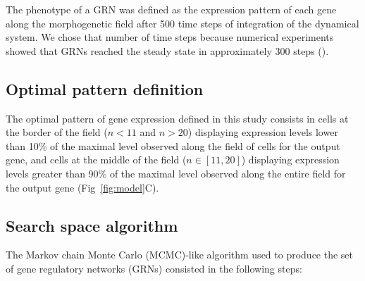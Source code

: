 \documentclass[10pt,letterpaper]{article}
\begin{document}
The phenotype of a GRN was defined as the expression pattern of each gene along
the morphogenetic field after 500 time steps of integration of the dynamical
system. We chose that number of time steps because numerical experiments showed
that GRNs reached the steady state in approximately 300 steps ().

\subsection*{Optimal pattern definition}

The optimal pattern of gene expression defined in this study consists in cells at
the border of the field ($n<11$ and $n>20$) displaying expression levels lower than
10\% of the maximal level observed along the field of cells for the output gene,
and cells at the middle of the field ($n ∈ [11,20]$) displaying expression
levels greater than 90\% of the maximal level observed along the entire field
for the output gene (Fig~\ref{fig:model}C).

\subsection*{Search space algorithm}

The Markov chain Monte Carlo (MCMC)-like algorithm used to produce the set of
gene regulatory networks (GRNs) consisted in the following steps:
\end{document}
